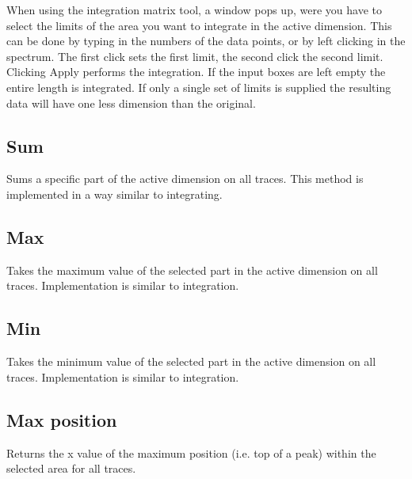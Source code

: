 \documentclass[11pt,a4paper]{article}
\begin{document}
When using the integration matrix tool, a window pops up, were you have to select the limits of the area you want to integrate in the active dimension.
This can be done by typing in the numbers of the data points, or  by left clicking in the spectrum.
The first click sets the first limit, the second click the second limit.
Clicking Apply performs the integration.
If the input boxes are left empty the entire length is integrated.
If only a single set of limits is supplied the resulting data will have one less dimension than the original.


\subsection{Sum}
Sums a specific part of the active dimension on all traces.
This method is implemented in a way similar to integrating.

\subsection{Max}
Takes the maximum value of the selected part in the active dimension on all traces.
Implementation is similar to integration.

\subsection{Min}
Takes the minimum value of the selected part in the active dimension on all traces.
Implementation is similar to integration.

\subsection{Max position}
Returns the x value of the maximum position (i.e. top of a peak) within the selected area for all traces.

\end{document}
